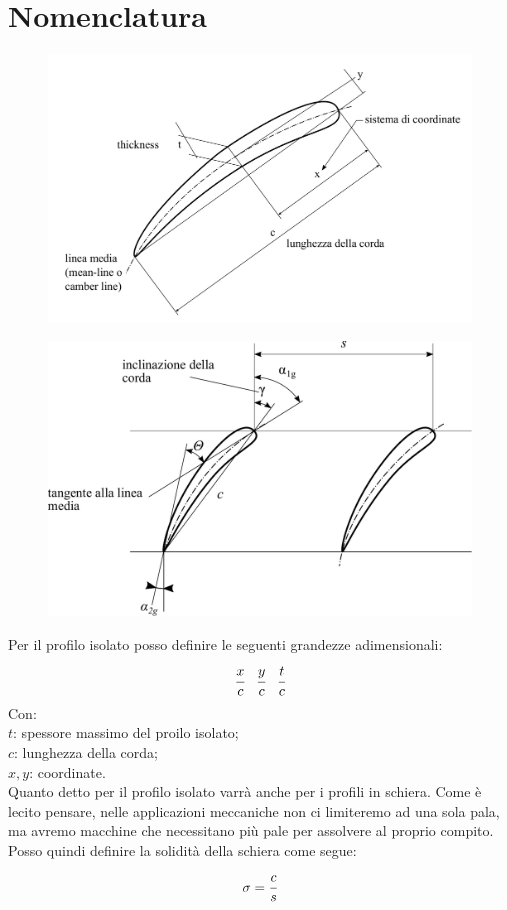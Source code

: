 \section{Nomenclatura}
\begin{figure}[h!]
\centering
\begin{minipage}{.5\textwidth}
  \centering
  \includegraphics[width=.98\linewidth]{fig/profiloDef.pdf}
  \label{}
\end{minipage}%
\begin{minipage}{.5\textwidth}
  \centering
  \includegraphics[width=.98\linewidth]{fig/schiera_2.pdf}
  \label{}
\end{minipage}
\end{figure}

Per il profilo isolato posso definire le seguenti grandezze adimensionali:
\begin{align*}
\cfrac{x}{c} \;\;\; \cfrac{y}{c} \;\;\; \cfrac{t}{c}
\end{align*}
Con:\\
$t$: spessore massimo del proilo isolato;\\
$c$: lunghezza della corda;\\
$x,y$: coordinate.\\[2mm]
Quanto detto per il profilo isolato varrà anche per i profili in schiera. Come è lecito pensare, nelle applicazioni meccaniche non ci limiteremo ad una sola pala, ma avremo macchine che necessitano più pale per assolvere al proprio compito. Posso quindi definire la solidità della schiera come segue:
\begin{equation}
\sigma = \cfrac{c}{s}
\end{equation}

